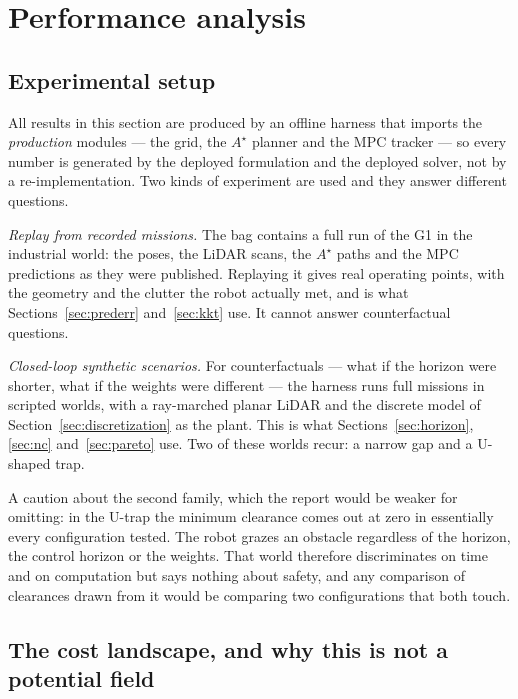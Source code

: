 \documentclass[11pt,a4paper]{article}
\newcommand{\astar}{$A^\star$}
\begin{document}
\section{Performance analysis}
\label{sec:performance}

\subsection{Experimental setup}
\label{sec:setup}

All results in this section are produced by an offline harness that imports the \emph{production} modules ---
the grid, the \astar{} planner and the MPC tracker --- so every number is generated by the deployed
formulation and the deployed solver, not by a re-implementation. Two kinds of experiment are used and they
answer different questions.

\emph{Replay from recorded missions.} The bag \resBag{} contains a full run of the G1 in the industrial world:
the poses, the LiDAR scans, the \astar{} paths and the MPC predictions as they were published. Replaying it
gives real operating points, with the geometry and the clutter the robot actually met, and is what
Sections~\ref{sec:prederr} and~\ref{sec:kkt} use. It cannot answer counterfactual questions.

\emph{Closed-loop synthetic scenarios.} For counterfactuals --- what if the horizon were shorter, what if the
weights were different --- the harness runs full missions in scripted worlds, with a ray-marched planar
LiDAR and the discrete model of Section~\ref{sec:discretization} as the plant. This is what
Sections~\ref{sec:horizon}, \ref{sec:nc} and~\ref{sec:pareto} use. Two of these worlds recur: a narrow gap
and a U-shaped trap.

A caution about the second family, which the report would be weaker for omitting: in the U-trap the minimum
clearance comes out at zero in essentially every configuration tested. The robot grazes an obstacle
regardless of the horizon, the control horizon or the weights. That world therefore discriminates on time and
on computation but says nothing about safety, and any comparison of clearances drawn from it would be
comparing two configurations that both touch.

\subsection{The cost landscape, and why this is not a potential field}
\label{sec:landscape}
\end{document}
